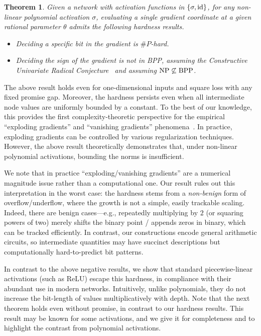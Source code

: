 \documentclass{article}
\newcommand{\id}{\textnormal{id}}
\theoremstyle{plain}
\newtheorem{theorem}{Theorem}[section]
\theoremstyle{definition}
\theoremstyle{remark}
\begin{document}
\begin{theorem}
    \label{thm:backprop-hard-bit}
    Given a network with activation functions in $\{\sigma,\id\}$, for any non-linear polynomial activation $\sigma$, evaluating a single gradient coordinate at a given rational parameter $\theta$ admits the following hardness results. 
    \begin{itemize}
    \item Deciding a specific bit in the gradient is \textnormal{$\#P$-hard}. 
        \item Deciding the sign of the gradient is not in \textnormal{BPP}, assuming the Constructive Univariate Radical Conjecture~\cite{10.1145/3510359} and assuming $\textnormal{NP} \not\subseteq \textnormal{BPP}$. 
    \end{itemize}
\end{theorem}


The above result holds even for one-dimensional inputs and square loss with any fixed promise gap. Moreover, the hardness persists even when all intermediate node values are uniformly bounded by a constant. 
To the best of our knowledge, this provides the first complexity-theoretic perspective for the empirical ``exploding gradients'' and ``vanishing gradients'' phenomena~\cite{hochreiter1991untersuchungen,hochreiter1998vanishing,bengio1994learning,glorot2010understanding,pascanu2013difficulty}. In practice, exploding gradients can be controlled by various regularization techniques. However, the above result theoretically demonstrates that, under non-linear polynomial activations, bounding the norms is insufficient. 

We note that in practice ``exploding/vanishing gradients'' are a numerical
magnitude issue rather than a computational one. Our result rules out this
interpretation in the worst case: the hardness stems from a \emph{non-benign}
form of overflow/underflow, where the growth is not a simple, easily trackable
scaling. Indeed, there are benign cases---e.g., repeatedly multiplying by $2$
(or squaring powers of two) merely shifts the binary point / appends zeros in
binary, which can be tracked efficiently. In contrast, our constructions encode
general arithmetic circuits, so intermediate quantities may have succinct
descriptions but computationally hard-to-predict bit patterns.



In contrast to the above negative results, we show that standard piecewise-linear activations (such as ReLU) escape this hardness, in compliance with their abundant use in modern networks. Intuitively, unlike polynomials, they do not increase the bit-length of values multiplicatively with depth. Note that the next theorem holds even without promise, in contrast to our hardness results. This result may be known for some activations, and we give it for completeness and to highlight the contrast from polynomial activations. 
\end{document}
